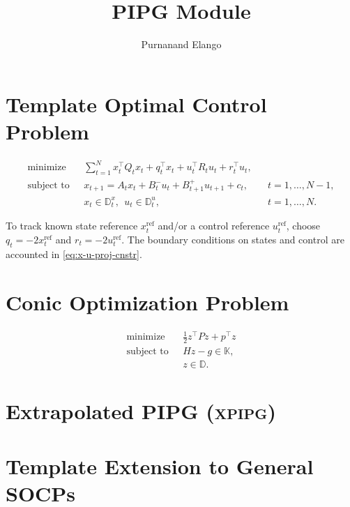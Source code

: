 \documentclass[letterpaper,11pt]{article}
\title{PIPG Module}
\author{Purnanand Elango}
\begin{document}
\maketitle 

\section{Template Optimal Control Problem}

\begin{subequations}
\begin{align}
    \operatorname{minimize}~~&~\sum_{t=1}^Nx_t^\top Q_t x_t +q_t^\top x_t + u_t^\top R_t u_t + r_t^\top u_t,\\
    \operatorname{subject~to}~~&~x_{t+1} = A_t x_t + B_t^{-}u_t + B_{t+1}^+u_{t+1} + c_t, & & t = 1,\ldots,N-1,\\
    &~x_t\in\mathbb{D}^x_t,~~u_t \in \mathbb{D}^u_t, & & t = 1,\ldots, N.\label{eq:x-u-proj-cnstr}  
\end{align}\label{prb:template-ocp}%
\end{subequations}

To track known state reference $x_t^{\text{ref}}$ and/or a control reference $u^{\text{ref}}_t$, choose $q_t = -2x_t^{\text{ref}}$ and $r_t = -2u^{\text{ref}}_t$. The boundary conditions on states and control are accounted in \eqref{eq:x-u-proj-cnstr}.

\section{Conic Optimization Problem}

\begin{subequations}
\begin{align}
    \operatorname{minimize}~~&~\frac{1}{2}z^\top P  z + p^\top z\\
    \operatorname{subject~to}~~&~Hz-g \in \mathbb{K},\\
    &~z\in\mathbb{D}.    
\end{align}    
\end{subequations}

\section{Extrapolated PIPG (\textsc{xpipg})}

\section{Template Extension to General SOCPs}
\end{document}
